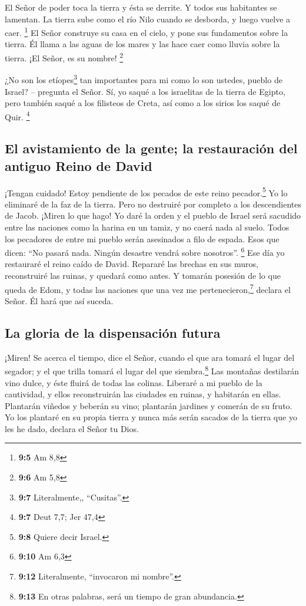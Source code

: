  El Señor de poder toca la tierra y ésta se derrite. Y
todos sus habitantes se lamentan. La tierra sube como el río Nilo cuando
se desborda, y luego vuelve a caer. \footnote{\textbf{9:5} Am 8,8}
 El Señor construye su casa en el cielo, y pone sus
fundamentos sobre la tierra. Él llama a las aguas de los mares y las
hace caer como lluvia sobre la tierra. ¡El Señor, es su nombre!
\footnote{\textbf{9:6} Am 5,8}

 ¿No son los etíopes\footnote{\textbf{9:7} Literalmente,,
  ``Cusitas''.} tan importantes para mi como lo son ustedes, pueblo de
Israel? -- pregunta el Señor. Sí, yo saqué a los israelitas de la tierra
de Egipto, pero también saqué a los filisteos de Creta, así como a los
sirios los saqué de Quir. \footnote{\textbf{9:7} Deut 7,7; Jer 47,4}

\hypertarget{el-avistamiento-de-la-gente-la-restauraciuxf3n-del-antiguo-reino-de-david}{%
\subsection{El avistamiento de la gente; la restauración del antiguo
Reino de
David}\label{el-avistamiento-de-la-gente-la-restauraciuxf3n-del-antiguo-reino-de-david}}

 ¡Tengan cuidado! Estoy pendiente de los pecados de este
reino pecador.\footnote{\textbf{9:8} Quiere decir Israel.} Yo lo
eliminaré de la faz de la tierra. Pero no destruiré por completo a los
descendientes de Jacob.  ¡Miren lo que hago! Yo daré la
orden y el pueblo de Israel será sacudido entre las naciones como la
harina en un tamiz, y no caerá nada al suelo.  Todos los
pecadores de entre mi pueblo serán asesinados a filo de espada. Esos que
dicen: ``No pasará nada. Ningún desastre vendrá sobre nosotros''.
\footnote{\textbf{9:10} Am 6,3}  Ese día yo restauraré el
reino caído de David. Repararé las brechas en sus muros, reconstruiré
las ruinas, y quedará como antes.  Y tomarán posesión de
lo que queda de Edom, y todas las naciones que una vez me
pertenecieron,\footnote{\textbf{9:12} Literalmente, ``invocaron mi
  nombre''.} declara el Señor. Él hará que así suceda.

\hypertarget{la-gloria-de-la-dispensaciuxf3n-futura}{%
\subsection{La gloria de la dispensación
futura}\label{la-gloria-de-la-dispensaciuxf3n-futura}}

 ¡Miren! Se acerca el tiempo, dice el Señor, cuando el
que ara tomará el lugar del segador; y el que trilla tomará el lugar del
que siembra.\footnote{\textbf{9:13} En otras palabras, será un tiempo de
  gran abundancia.} Las montañas destilarán vino dulce, y éste fluirá de
todas las colinas.  Liberaré a mi pueblo de la
cautividad, y ellos reconstruirán las ciudades en ruinas, y habitarán en
ellas. Plantarán viñedos y beberán su vino; plantarán jardines y comerán
de su fruto.  Yo los plantaré en su propia tierra y nunca
más serán sacados de la tierra que yo les he dado, declara el Señor tu
Dios.
